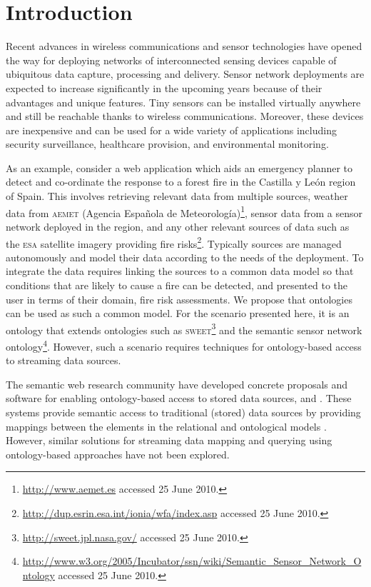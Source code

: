 \section{Introduction}
\label{intro}

Recent advances in wireless communications and sensor technologies have opened the way for deploying networks of interconnected sensing devices capable of ubiquitous data capture, processing and delivery.
Sensor network deployments are expected to increase significantly in the upcoming years because of their advantages and unique features.
Tiny sensors can be installed virtually anywhere and still be reachable thanks to wireless communications. 
Moreover, these devices are inexpensive and can be used for a wide variety of applications including security surveillance, healthcare provision, and environmental monitoring.

As an example, consider a web application which aids an emergency planner to detect and co-ordinate the response to a forest fire in the Castilla y Le\'on region of Spain. 
This involves retrieving relevant data from multiple sources, \eg weather data from \textsc{aemet} (Agencia Espa\~nola de Meteorolog\'ia)\footnote{\url{http://www.aemet.es} accessed 25 June 2010.}, sensor data from a sensor network deployed in the region, and any other relevant sources of data such as the \textsc{esa} satellite imagery providing fire risks\footnote{\url{http://dup.esrin.esa.int/ionia/wfa/index.asp} accessed 25 June 2010.}. 
Typically sources are managed autonomously and model their data according to the needs of the deployment.
To integrate the data requires linking the sources to a common data model so that conditions that are likely to cause a fire can be detected, and presented to the user in terms of their domain, \eg fire risk assessments.
We propose that ontologies can be used as such a common model.
For the scenario presented here, it is an ontology that extends ontologies such as \textsc{sweet}\footnote{\url{http://sweet.jpl.nasa.gov/} accessed 25 June 2010.} and the semantic sensor network ontology\footnote{\url{http://www.w3.org/2005/Incubator/ssn/wiki/Semantic_Sensor_Network_Ontology} accessed 25 June 2010.}.
However, such a scenario requires techniques for ontology-based access to streaming data sources.

The semantic web research community have developed concrete proposals and software for enabling ontology-based access to stored data sources, \eg \rtwoo \cite{Barrasa_04} and \dtworq \cite{Bizer_07}.
These systems provide semantic access to traditional (stored) data sources by providing mappings
between the elements in the relational and ontological models \cite{Sahoo_09}.
However, similar solutions for streaming data mapping and querying using ontology-based approaches have not been explored.

